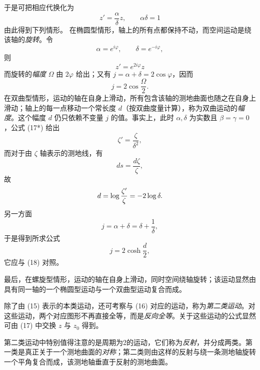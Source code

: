 于是可把相应代换化为
\[
 z'=\frac{\alpha}{\delta}z,\qquad \alpha\delta=1
\]
由此得到下列情形。
在椭圆型情形，轴上的所有点都保持不动，而空间运动是绕该轴的\emph{旋转}。令
\[
 \alpha=e^{i\varphi},\qquad \delta=e^{-i\varphi},
\]
则
\[
 z'=e^{2i\varphi}z
\]
而旋转的\emph{幅度} \(\Omega\) 由 \(2\varphi\) 给出；又有 \(j=\alpha+\delta=2\cos\varphi\)，因而
\[
\tag{18}
 j=2\cos\frac{\Omega}{2}.
\]
在双曲型情形，运动的轴在自身上滑动，所有包含该轴的测地曲面也随之在自身上滑动；轴上的每一点移动一个常长度 \(d\)（按双曲度量计算），称为双曲运动的\emph{幅度}。这个幅度 \(d\) 仍只依赖不变量 \(j\) 的值。事实上，此时 \(\alpha,\delta\) 为实数且 \(\beta=\gamma=0\)，公式 (17*) 给出
\[
 \zeta'=\frac{\zeta}{\delta^2},
\]
而对于由 \(\zeta\) 轴表示的测地线，有
\[
 ds=\frac{d\zeta}{\zeta},
\]
故
\[
 d=\log\frac{\zeta'}{\zeta}=-2\log\delta.
\]
另一方面
\[
 j=\alpha+\delta=\delta+\frac1\delta,
\]
于是得到所求公式
\[
\tag{18*}
 j=2\cosh\frac d2,
\]
它应与 (18) 对照。

最后，在螺旋型情形，运动的轴在自身上滑动，同时空间绕轴旋转；该运动显然由具有同一轴的一个椭圆型运动与一个双曲型运动复合而成。

除了由 (15) 表示的本类运动，还可考察与 (16) 对应的运动，称为\emph{第二类运动}。对这些运动，两个对应图形不再直接全等，而是\emph{反向全等}。关于这些运动的公式显然可由 (17) 中交换 \(z\) 与 \(z_0\) 得到。

第二类运动中特别值得注意的是周期为2的运动，它们称为\emph{反射}，并分成两类。第一类是真正关于一个测地曲面的\emph{对称}；第二类则由这样的反射与绕一条测地轴旋转一个平角复合而成，该测地轴垂直于反射的测地曲面。
